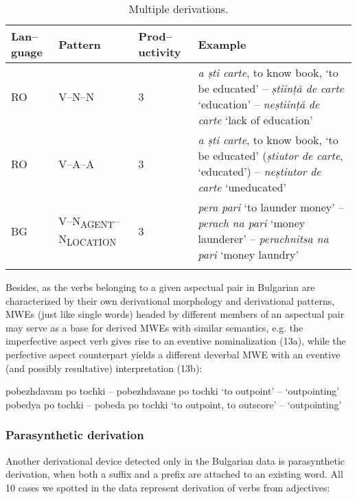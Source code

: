 \documentclass[output=paper]{langsci/langscibook}
\begin{document}
\begin{table}[H]
\begin{tabular}
{p{0.8cm}p{1.7cm}p{1cm}p{6.9cm}}
\lsptoprule
{ \textbf{Lan–guage}} &
{ \textbf{Pattern}} &
{ \textbf{Prod–uctivity}} &
{ \textbf{Example}}\\
\midrule
{ RO} &
{ V–N–N} &
{ 3} &
{\textit{a ști carte}, to know book, ‘to be
educated’ – \textit{știință de carte}  ‘education’ – \textit{neștiință de carte}
‘lack of education’}\\\hline
{ RO} &
{ V–A–A} &
{ 3} &
{ \textit{a ști carte}, to know book, `to be educated'  (\textit{știutor de carte}, 
`educated') – \textit{neștiutor de carte}  ‘uneducated’}\\\hline
{ BG} &
{
V–N\textsubscript{AGENT}–N\textsubscript{LOCATION}} &
{ 3} &
{ \textit{pera pari}  ‘to launder money’ –
\textit{perach na pari} ‘money launderer’ – \textit{perachnitsa na pari}  ‘money
laundry’}\\
\lspbottomrule
\end{tabular}
\caption{Multiple derivations.}
\label{tab:8:2}
\end{table}


Besides, as the verbs belonging to a given aspectual pair in Bulgarian
are characterized by their own derivational morphology and derivational
patterns, MWEs (just like single words) headed by different members of
an aspectual pair may serve as a base for derived MWEs with similar
semantics, e.g. the imperfective aspect verb gives rise to an eventive
nominalization (13a), while the perfective aspect counterpart yields a
different deverbal MWE with an eventive (and possibly resultative)
interpretation (13b):



\begin{exe}
\ex \label{ex:8:13}
\settowidth{}
\begin{xlist}
\ex \label{ex:8:13a} 
pobezhdavam po tochki  – pobezhdavane po tochki 
‘to outpoint’ – ‘outpointing’
\ex \label{ex:8:13b} 
pobedya po tochki  – pobeda po tochki 
‘to outpoint, to outscore’ – ‘outpointing’
\end{xlist}
\end{exe}

\subsubsection{Parasynthetic derivation}
\label{parasynthetic}

Another derivational device detected only in the Bulgarian data is
parasynthetic derivation, when both a suffix and a prefix are attached
to an existing word. All 10 cases we spotted in the data represent
derivation of verbs from adjectives:
\end{document}
